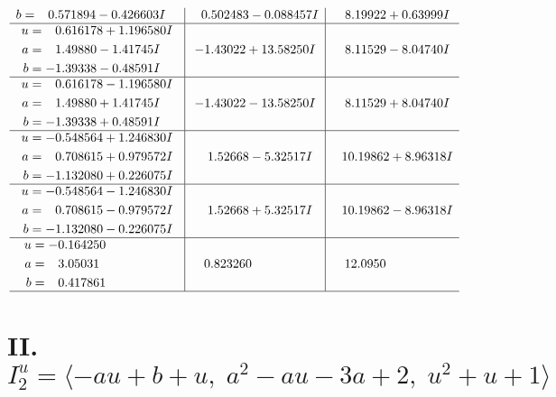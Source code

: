 \documentclass[1p]{elsarticle_modified}
\theoremstyle{definition}
\begin{document}
$$\begin{array}{c|c|c}
\begin{aligned}
b &= \phantom{-}0.571894 - 0.426603 I\end{aligned}
 & \phantom{-}0.502483 - 0.088457 I & \phantom{-}8.19922 + 0.63999 I \\ \hline\begin{aligned}
u &= \phantom{-}0.616178 + 1.196580 I \\
a &= \phantom{-}1.49880 - 1.41745 I \\
b &= -1.39338 - 0.48591 I\end{aligned}
 & -1.43022 + 13.58250 I & \phantom{-}8.11529 - 8.04740 I \\ \hline\begin{aligned}
u &= \phantom{-}0.616178 - 1.196580 I \\
a &= \phantom{-}1.49880 + 1.41745 I \\
b &= -1.39338 + 0.48591 I\end{aligned}
 & -1.43022 - 13.58250 I & \phantom{-}8.11529 + 8.04740 I \\ \hline\begin{aligned}
u &= -0.548564 + 1.246830 I \\
a &= \phantom{-}0.708615 + 0.979572 I \\
b &= -1.132080 + 0.226075 I\end{aligned}
 & \phantom{-}1.52668 - 5.32517 I & \phantom{-}10.19862 + 8.96318 I \\ \hline\begin{aligned}
u &= -0.548564 - 1.246830 I \\
a &= \phantom{-}0.708615 - 0.979572 I \\
b &= -1.132080 - 0.226075 I\end{aligned}
 & \phantom{-}1.52668 + 5.32517 I & \phantom{-}10.19862 - 8.96318 I \\ \hline\begin{aligned}
u &= -0.164250\phantom{ +0.000000I} \\
a &= \phantom{-}3.05031\phantom{ +0.000000I} \\
b &= \phantom{-}0.417861\phantom{ +0.000000I}\end{aligned}
 & \phantom{-}0.823260\phantom{ +0.000000I} & \phantom{-}12.0950\phantom{ +0.000000I}\\
 \hline 
 \end{array}$$\newpage\newpage\renewcommand{\arraystretch}{1}
\centering \section*{II. $I^u_{2}= \langle - a u+b+u,\;a^2- a u-3 a+2,\;u^2+u+1 \rangle$}
\end{document}
